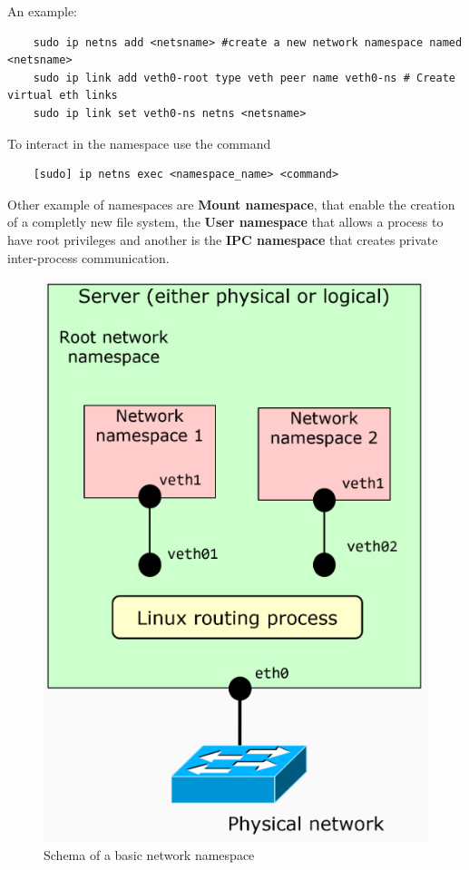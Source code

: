 An example:
\begin{verbatim}
    sudo ip netns add <netsname> #create a new network namespace named <netsname>
    sudo ip link add veth0-root type veth peer name veth0-ns # Create virtual eth links
    sudo ip link set veth0-ns netns <netsname>
\end{verbatim}
To interact in the namespace use the command
\begin{verbatim}
    [sudo] ip netns exec <namespace_name> <command>
\end{verbatim}

Other example of namespaces are \textbf{Mount namespace}, that enable the creation of a completly new file system, the \textbf{User namespace} that allows a process to have root privileges and another is the \textbf{IPC namespace} that creates private inter-process communication.
\begin{figure}
    \centering
    \includegraphics[scale=0.5]{images/netnamespace.png}
    \caption{Schema of a basic network namespace}
    \label{fig:netnamespace}
\end{figure}

